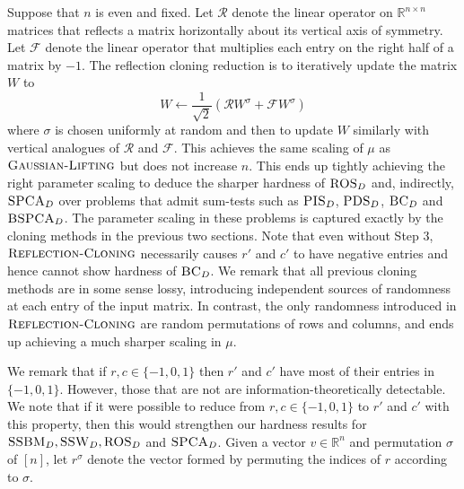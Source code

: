 Suppose that $n$ is even and fixed. Let $\mathcal{R}$ denote the linear operator on $\mathbb{R}^{n \times n}$ matrices that reflects a matrix horizontally about its vertical axis of symmetry. Let $\mathcal{F}$ denote the linear operator that multiplies each entry on the right half of a matrix by $-1$. The reflection cloning reduction is to iteratively update the matrix $W$ to
$$W \gets \frac{1}{\sqrt{2}} \left( \mathcal{R} W^\sigma + \mathcal{F} W^\sigma \right)$$
where $\sigma$ is chosen uniformly at random and then to update $W$ similarly with vertical analogues of $\mathcal{R}$ and $\mathcal{F}$. This achieves the same scaling of $\mu$ as $\textsc{Gaussian-Lifting}$ but does not increase $n$. This ends up tightly achieving the right parameter scaling to deduce the sharper hardness of $\textsc{ROS}_D$ and, indirectly, $\textsc{SPCA}_D$ over problems that admit sum-tests such as $\textsc{PIS}_D$, $\textsc{PDS}_D$, $\textsc{BC}_D$ and $\textsc{BSPCA}_D$. The parameter scaling in these problems is captured exactly by the cloning methods in the previous two sections. Note that even without Step 3, $\textsc{Reflection-Cloning}$ necessarily causes $r'$ and $c'$ to have negative entries and hence cannot show hardness of $\textsc{BC}_D$. We remark that all previous cloning methods are in some sense lossy, introducing independent sources of randomness at each entry of the input matrix. In contrast, the only randomness introduced in $\textsc{Reflection-Cloning}$ are random permutations of rows and columns, and ends up achieving a much sharper scaling in $\mu$.

We remark that if $r, c \in \{-1, 0, 1\}$ then $r'$ and $c'$ have most of their entries in $\{-1, 0, 1\}$. However, those that are not are information-theoretically detectable. We note that if it were possible to reduce from $r, c \in \{-1, 0, 1\}$ to $r'$ and $c'$ with this property, then this would strengthen our hardness results for $\textsc{SSBM}_D, \textsc{SSW}_D, \textsc{ROS}_D$ and $\textsc{SPCA}_D$. Given a vector $v \in \mathbb{R}^n$ and permutation $\sigma$ of $[n]$, let $r^\sigma$ denote the vector formed by permuting the indices of $r$ according to $\sigma$.

